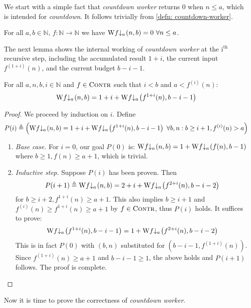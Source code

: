 We start with a simple fact that \emph{countdown worker} returns $0$ when $n\le a$, which is intended for \emph{countdown}. It follows trivially from \cref{defn: countdown-worker}.

\begin{lem} \label{lem: cdt-init}
	For all $a, b\in \mathbb{N}$, $f : \mathbb{N}\to \mathbb{N}$ we have $\W\cdt{f}{a} (n, b) = 0 \ \forall n\le a$.
\end{lem}

The next lemma shows the internal working of \emph{countdown worker} at the $\text{i}^\text{th}$ recursive step, including the accumulated result $1+i$, the current input $f^{(1+i)}(n)$, and the current budget $b-i-1$.

\begin{lem} \label{lem: cdt-intermediate}
	For all $a, n, b, i\in \mathbb{N}$ and $f \in \text{\scshape{Contr}}$ such that $i < b$ and $a < f^{(i)}(n)$:
	\begin{equation}  \label{eq: cdt-intermediate}
	\W\cdt{f}{a}(n, b) = 1 + i + \W\cdt{f}{a}\left(f^{1+i}(n), b - i - 1\right)
	\end{equation}
\end{lem}
\begin{proof}
	We proceed by induction on $i$. Define
	\begin{equation*}
	P(i) \triangleq \left(\W\cdt{f}{a}(n, b) = 1 + i + \W\cdt{f}{a}\left(f^{1+i}(n), b - i - 1\right) \ \forall b, n : b\ge i+1, f^{(i)}(n) > a\right)
	\end{equation*}
	\begin{enumerate}[leftmargin=*]
		\item \textit{Base case.} For $i = 0$, our goal $P(0)$ is:
		$\W\cdt{f}{a}(n, b) = 1 + \W\cdt{f}{a}\left(f(n), b - 1\right)$
		where $b \ge 1, f(n)\ge a+1$, which is trivial.
		\item \textit{Inductive step.} Suppose $P(i)$ has been proven. Then
		\begin{equation*}
		P(i+1) \triangleq \W\cdt{f}{a}(n, b) = 2 + i + \W\cdt{f}{a}\left( f^{2+i}(n), b - i - 2 \right)
		\end{equation*}
		for $b \ge i+2, f^{1+i}(n) \ge a+1$. This also implies $b\ge i+1$ and $\displaystyle f^{(i)}(n) \ge f^{1+i}(n)\ge a+1$ by $f\in \text{\scshape{Contr}}$, thus $P(i)$ holds. It suffices to prove:
		\begin{equation*}
		\W\cdt{f}{a}\left(f^{1+i}(n), b-i-1\right) = 1 + \W\cdt{f}{a}\left( f^{2+i}(n), b-i-2 \right)
		\end{equation*}
		This is in fact $P(0)$ with $(b, n)$ substituted for $\left(b-i-1, f^{(1+i)}(n)\right)$. Since $f^{(1+i)}(n) \ge a+1$ and $b-i-1\ge 1$, the above holds and $P(i+1)$ follows. The proof is complete.\vspace*{-\baselineskip}
	\end{enumerate}
\end{proof}
Now it is time to prove the correctness of \emph{countdown worker}.

